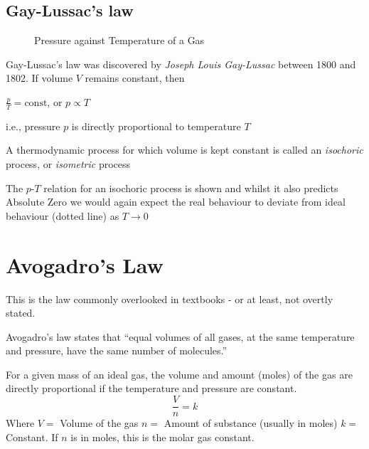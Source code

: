 \documentclass[a4paper,12pt]{book}
\newcommand{\cmt}{}
\newcommand{\piste}{{\fontencoding{U}\fontfamily{futs}\selectfont\char 49\relax}}
\newenvironment{ilight}
  {\centering
  	\vspace*{6pt}
  	\begin{tcolorbox}[colframe=Gray,colback=LightGrey!15]
  \setlength{\baselineskip}{\baselineskip}%
  }
  {\end{tcolorbox}\vspace*{-4pt}}
\newcommand{\tcbhighmath}[1]{\boxed{#1}}
\newcommand{\piste}{\textsuperscript{$\star$}}
\newcommand{\cmt}{}
\begin{document}
\subsection*{Gay-Lussac's law}

\begin{figure}
		\caption{Pressure against Temperature of a Gas}
\end{figure}

Gay-Lussac's law was discovered by \emph{Joseph Louis Gay-Lussac} between 1800 and 1802. If volume $V$ remains constant, then

{
	
	\centering
	
	$\tcbhighmath{\frac{p}{T}=\text{const}}$, or $\tcbhighmath{p \propto T}$
	
} 

i.e., pressure $p$ is directly proportional to temperature $T$

\cmt \piste A thermodynamic process for which volume is kept constant is called an \emph{isochoric} process, or \emph{isometric} process

The $p$-$T$ relation for an isochoric process is shown and whilst it also predicts Absolute Zero we would again expect the real behaviour to  deviate from ideal behaviour (dotted line) as $T\to0$

\section{Avogadro's Law}

This is the law commonly overlooked in textbooks - or at least, not overtly stated. 
\begin{ilight}
    Avogadro's law states that ``equal volumes of all gases, at the same temperature and pressure, have the same number of molecules.''
\end{ilight}
For a given mass of an ideal gas, the volume and amount (moles) of the gas are directly proportional if the temperature and pressure are constant.
$$\frac{V}{n}=k$$
Where
$V=$ Volume of the gas
$n=$ Amount of substance (usually in moles)
$k=$ Constant. If $n$ is in moles, this is the molar gas constant.
\end{document}
